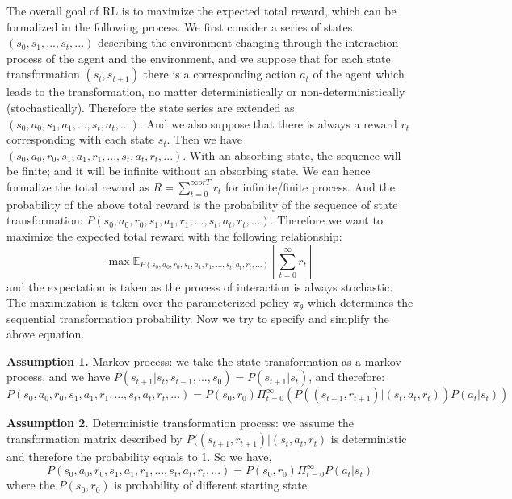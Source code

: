 \documentclass{article}
\begin{document}
The overall goal of RL is to maximize the expected total reward, which can be formalized in the following process. We first consider a series of states $(s_0, s_1, ..., s_t, ...)$ describing the environment changing through the interaction process of the agent and the environment, and we suppose that for each state transformation $(s_t, s_{t+1})$ there is a corresponding action $a_t$ of the agent which leads to the transformation, no matter deterministically or non-deterministically (stochastically). Therefore the state series are extended as $(s_0, a_0, s_1, a_1, ..., s_t, a_t, ...)$. And we also suppose that there is always a reward $r_t$ corresponding with each state $s_t$. Then we have $(s_0, a_0, r_0, s_1, a_1, r_1, ..., s_t, a_t, r_t,...)$. With an absorbing state, the sequence will be finite; and it will be infinite without an absorbing state. We can hence formalize the total reward as $R=\sum_{t=0}^{\infty or T}r_t$ for infinite/finite process. And the probability of the above total reward is the probability of the sequence of state transformation: $P(s_0, a_0, r_0, s_1, a_1, r_1, ..., s_t, a_t, r_t,...)$. Therefore we want to maximize the expected total reward with the following relationship:
\begin{equation}
    \max\mathbb{E}_{P(s_0, a_0, r_0, s_1, a_1, r_1, ..., s_t, a_t, r_t,...)}[\sum_{t=0}^{\infty}r_t]
\end{equation}
and the expectation is taken as the process of interaction is always stochastic. The maximization is taken over the parameterized policy $\pi_\theta$ which determines the sequential transformation probability. Now we try to specify and simplify the above equation.

\textbf{Assumption 1.} Markov process: we take the state transformation as a markov process, and we have $P(s_{t+1}|s_t, s_{t-1},...,s_0)=P(s_{t+1}|s_t)$, and therefore: \begin{equation}
    P(s_0, a_0, r_0, s_1, a_1, r_1, ..., s_t, a_t, r_t,...) = P(s_0, r_0)\Pi_{t=0}^\infty (P((s_{t+1}, r_{t+1})|(s_t,a_t,r_t))P(a_{t}|s_{t}))
\end{equation}

\textbf{Assumption 2.} Deterministic transformation process: we assume the transformation matrix described by $P((s_{t+1}, r_{t+1})|(s_t,a_t,r_t)$ is deterministic and therefore the probability equals to 1. So we have,
\begin{equation}
    P(s_0, a_0, r_0, s_1, a_1, r_1, ..., s_t, a_t, r_t,...) = P(s_0, r_0)\Pi_{t=0}^\infty P(a_{t}|s_{t})
\end{equation}
where the $P(s_0, r_0)$ is probability of different starting state.
\end{document}
